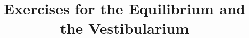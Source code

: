 
\graphicspath{{../../../images/Exercises/}} %


\title{Exercises for the Equilibrium and the Vestibularium} %



\begin{frame}
\titlepage %
\end{frame}












 